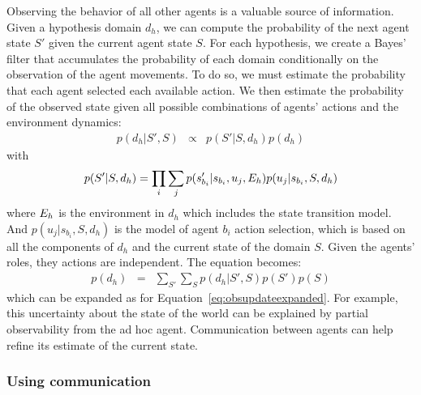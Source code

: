 Observing the behavior of all other agents is a valuable source of information. Given a hypothesis domain $d_h$, we can compute the probability of the next agent state $S'$ given the current agent state $S$. For each hypothesis, we create a Bayes' filter that accumulates the probability of each domain conditionally on the observation of the agent movements.
To do so, we must estimate the probability that each agent selected each available action. We then estimate the probability of the observed state given all possible combinations of agents' actions and the environment dynamics:
%
\begin{eqnarray}
p(d_h|S',S) &\propto& p(S'|S,d_h) p(d_h)
\label{eq:obsupdate}
\end{eqnarray}
%
with
%
\begin{eqnarray}
p(S'|S,d_h) = \prod_i \sum_j p(s'_{b_i}|s_{b_i},u_j,E_h) p(u_j|s_{b_i}, S, d_h)
\label{eq:obsupdateexpanded}
\end{eqnarray}
%
where $E_h$ is the environment in $d_h$ which includes the state transition model. And $p(u_j|s_{b_i}, S, d_h)$ is the model of agent $b_i$ action selection, which is based on all the components of $d_h$ and the current state of the domain $S$. Given the agents' roles, they actions are independent. %
The equation becomes:
%
\begin{eqnarray}
p(d_h) &=& \sum_{S'} \sum_S p(d_h|S',S) p(S') p(S)
\label{eq:obsupdatestateprob}
\end{eqnarray}
%
which can be expanded as for Equation~\ref{eq:obsupdateexpanded}. For example, this uncertainty about the state of the world can be explained by partial observability from the ad hoc agent. Communication between agents can help refine its estimate of the current state.

\subsubsection{Using communication}

